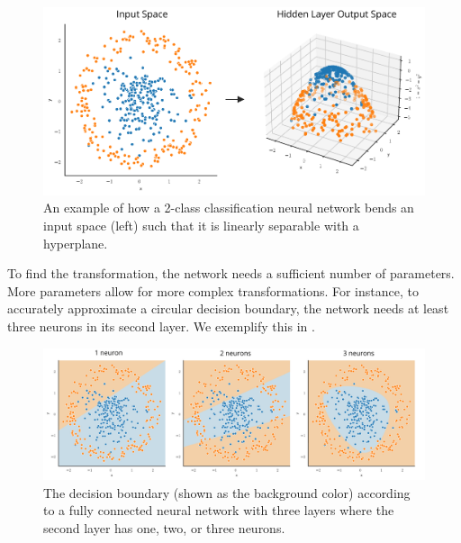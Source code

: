 	\begin{figure}[h]
		\centering
		\includegraphics[width=0.65\linewidth]{images/4/nn_trans_dataset}
		\caption{An example of how a 2-class classification neural network bends an input space (left) such that it is linearly separable with a hyperplane.}
		\label{fig:input-space-transform}
	\end{figure}

To find the transformation, the network needs a sufficient number of parameters. More parameters allow for more complex transformations. For instance, to accurately approximate a circular decision boundary, the network needs at least three neurons in its second layer. We exemplify this in .

	\begin{figure}[h]
		\centering
		\includegraphics[width=\linewidth]{images/4/circular_dataset_neurons}
		\caption{The decision boundary (shown as the background color) according to a fully connected neural network with three layers where the second layer has one, two, or three neurons.}
		\label{fig:circ-datataset-neurons}
	\end{figure}


